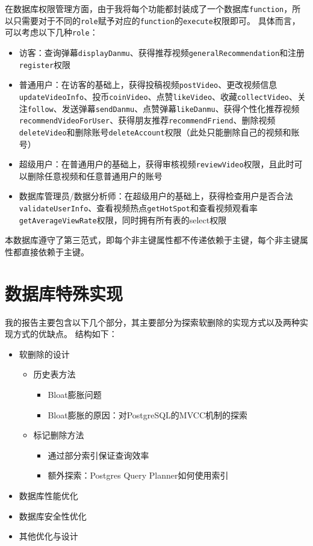 \documentclass[a4paper,10pt]{ctexart}
\begin{document}
在数据库权限管理方面，由于我将每个功能都封装成了一个数据库\texttt{function}，所以只需要对于不同的\texttt{role}赋予对应的\texttt{function}的\texttt{execute}权限即可。
具体而言，可以考虑以下几种\texttt{role}：
\begin{itemize}
    \item 访客：查询弹幕\texttt{displayDanmu}、获得推荐视频\texttt{generalRecommendation}和注册\texttt{register}权限
    \item 普通用户：在访客的基础上，获得投稿视频\texttt{postVideo}、更改视频信息\texttt{updateVideoInfo}、投币\texttt{coinVideo}、点赞\texttt{likeVideo}、收藏\texttt{collectVideo}、关注\texttt{follow}、发送弹幕\texttt{sendDanmu}、点赞弹幕\texttt{likeDanmu}、获得个性化推荐视频\texttt{recommendVideoForUser}、获得朋友推荐\texttt{recommendFriend}、删除视频\texttt{deleteVideo}和删除账号\texttt{deleteAccount}权限（此处只能删除自己的视频和账号）
    \item 超级用户：在普通用户的基础上，获得审核视频\texttt{reviewVideo}权限，且此时可以删除任意视频和任意普通用户的账号
    \item 数据库管理员/数据分析师：在超级用户的基础上，获得检查用户是否合法\texttt{validateUserInfo}、查看视频热点\texttt{getHotSpot}和查看视频观看率\texttt{getAverageViewRate}权限，同时拥有所有表的select权限
\end{itemize}

本数据库遵守了第三范式，即每个非主键属性都不传递依赖于主键，每个非主键属性都直接依赖于主键。

\section{数据库特殊实现}

我的报告主要包含以下几个部分，其主要部分为探索软删除的实现方式以及两种实现方式的优缺点。
结构如下：
\begin{itemize}
    \item 软删除的设计
        \begin{itemize}
            \item 历史表方法
                \begin{itemize}
                    \item Bloat膨胀问题
                    \item Bloat膨胀的原因：对PostgreSQL的MVCC机制的探索
                \end{itemize}
            \item 标记删除方法
                \begin{itemize}
                    \item 通过部分索引保证查询效率
                    \item 额外探索：Postgres Query Planner如何使用索引
                \end{itemize}
        \end{itemize}
    \item 数据库性能优化
    \item 数据库安全性优化
    \item 其他优化与设计
\end{itemize}
\end{document}

